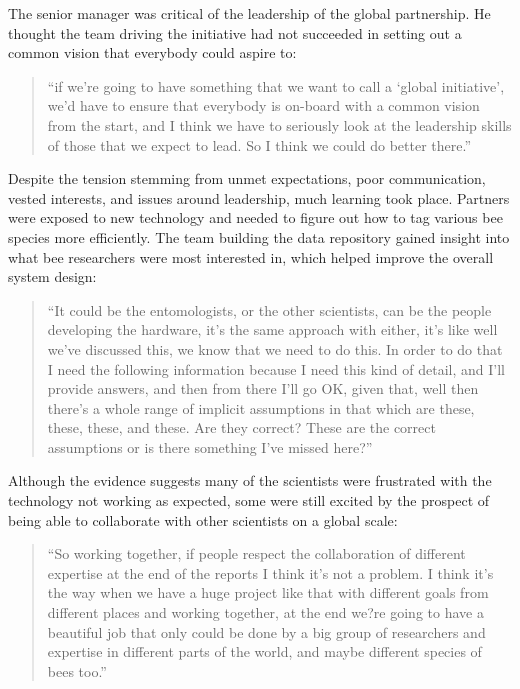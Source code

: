 The senior manager was critical of the leadership of the global partnership. He thought the team driving the initiative had not succeeded in setting out a common vision that everybody could aspire to:

\begin{quote}
\small
\enquote{if we're going to have something that we want to call a \enquote{global initiative}, we'd have to ensure that everybody is on-board with a common vision from the start, and I think we have to seriously look at the leadership skills of those that we expect to lead. So I think we could do better there.} \\
\end{quote}

Despite the tension stemming from unmet expectations, poor communication, vested interests, and issues around leadership, much learning took place. Partners were exposed to new technology and needed to figure out how to tag various bee species more efficiently. The team building the data repository gained insight into what bee researchers were most interested in, which helped improve the overall system design:

\begin{quote}
\small
\enquote{It could be the entomologists, or the other scientists, can be the people developing the hardware, it's the same approach with either, it's like well we've discussed this, we know that we need to do this. In order to do that I need the following information because I need this kind of detail, and I'll provide answers, and then from there I'll go OK, given that, well then there’s a whole range of implicit assumptions in that which are these, these, these, and these. Are they correct?  These are the correct assumptions or is there something I've missed here?} \\
\end{quote}

Although the evidence suggests many of the scientists were frustrated with the technology not working as expected, some were still excited by the prospect of being able to collaborate with other scientists on a global scale: 

\begin{quote}
\small
\enquote{So working together, if people respect the collaboration of different expertise at the end of the reports I think it's not a problem.  I think it's the way when we have a huge project like that with different goals from different places and working together, at the end we?re going to have a beautiful job that only could be done by a big group of researchers and expertise in different parts of the world, and maybe different species of bees too.} \\
\end{quote}

